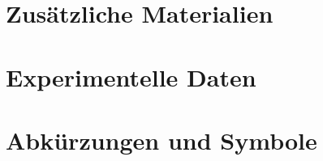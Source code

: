 \renewcommand{\thepage}{\Roman{page}} %

\chapter{Zusätzliche Materialien}
\lipsum[1-4]

\chapter{Experimentelle Daten}
\lipsum[5-8]

\chapter{Abkürzungen und Symbole}
\lipsum[9-17]